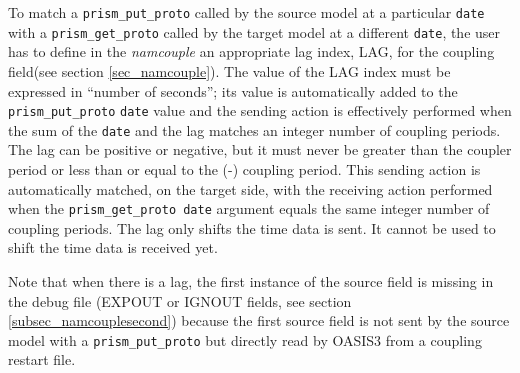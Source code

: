 To match a {\tt prism\_put\_proto} called by the source model at a
particular {\tt date} with a {\tt prism\_get\_proto} called by the target
model at a different {\tt date}, the user has to define in the {\it
namcouple} an appropriate lag index, LAG, for the coupling field(see
section \ref{sec_namcouple}). The value of the LAG index must be
expressed in ``number of seconds''; its value is automatically added
to the {\tt prism\_put\_proto} {\tt date} value and the sending action is
effectively performed when the sum of the {\tt date} and the lag matches an
integer number of coupling periods. The lag can be positive or negative,
but it must never be greater than the coupler period or less than or
equal to the (-) coupling period.  This sending action is
automatically matched, on the target side, with the receiving action
performed when the {\tt prism\_get\_proto date} argument equals the
same integer number of coupling periods.  The lag only shifts the
time data is sent.  It cannot be used to shift the time data is
received yet.

Note that when there is a lag, the first instance of the source field
is missing in the debug file (EXPOUT or IGNOUT fields, see section
\ref{subsec_namcouplesecond}) because the first source field is not
sent by the source model with a {\tt prism\_put\_proto} but directly
read by OASIS3 from a coupling restart file.
 
